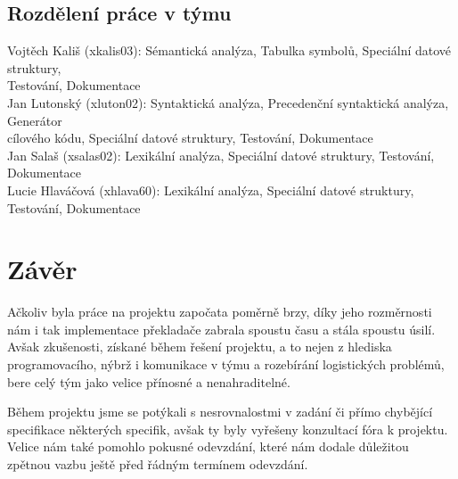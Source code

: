\documentclass[a4paper, 11pt]{article}
\begin{document}
	\subsection{Rozdělení práce v týmu}
		\hspace*{0.25cm}	Vojtěch Kališ (xkalis03): \hspace{0.2cm} Sémantická analýza, Tabulka symbolů, Speciální datové struktury,\\
		\hspace*{5.08cm} Testování, Dokumentace\\
		\hspace*{0.8cm} 	Jan Lutonský (xluton02): \hspace{0.2cm} Syntaktická analýza, Precedenční syntaktická analýza, Generátor\\
		\hspace*{5.08cm} cílového kódu, Speciální datové struktury, Testování, Dokumentace\\
		\hspace*{1.5cm}	Jan Salaš (xsalas02): \hspace{0.2cm} Lexikální analýza, Speciální datové struktury, Testování, Dokumentace\\
		\hspace*{0.25cm}	Lucie Hlaváčová (xhlava60): \hspace{0.2cm} Lexikální analýza, Speciální datové struktury, Testování, Dokumentace\\
	\section{Závěr}
	Ačkoliv byla práce na projektu započata poměrně brzy, díky jeho rozměrnosti nám i tak implementace překladače zabrala spoustu času a stála spoustu úsilí. 
	Avšak zkušenosti, získané během řešení projektu, a to nejen z hlediska programovacího, nýbrž i komunikace v týmu a rozebírání logistických problémů, 
	bere celý tým jako velice přínosné a nenahraditelné. 

	Během projektu jsme se potýkali s nesrovnalostmi v zadání či přímo chybějící specifikace některých specifik, avšak ty byly vyřešeny konzultací fóra k 
	projektu. Velice nám také pomohlo pokusné odevzdání, které nám dodale důležitou zpětnou vazbu ještě před řádným termínem odevzdání.
	\newpage
	
	\begingroup\centering
\end{document}
